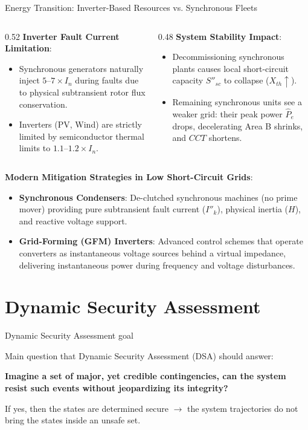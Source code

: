 \begin{frame}[allowframebreaks]{Energy Transition: Inverter-Based Resources vs. Synchronous Fleets}
\begin{columns}
    \begin{column}{0.52\textwidth}
    \textbf{Inverter Fault Current Limitation}:
    \begin{itemize}
        \item Synchronous generators naturally inject $5\text{--}7 \times I_n$ during faults due to physical subtransient rotor flux conservation.
        \item Inverters (PV, Wind) are strictly limited by semiconductor thermal limits to $1.1\text{--}1.2 \times I_n$.
    \end{itemize}
    \end{column}
    \begin{column}{0.48\textwidth}
    \textbf{System Stability Impact}:
    \begin{itemize}
        \item Decommissioning synchronous plants causes local short-circuit capacity $S''_{sc}$ to collapse ($X_{th} \uparrow$).
        \item Remaining synchronous units see a weaker grid: their peak power $\hat{P}_e$ drops, decelerating Area B shrinks, and $CCT$ shortens.
    \end{itemize}
    \end{column}
\end{columns}

\framebreak

\textbf{Modern Mitigation Strategies in Low Short-Circuit Grids}:
\begin{itemize}
    \item \textbf{Synchronous Condensers}: 
    De-clutched synchronous machines (no prime mover) providing pure subtransient fault current ($I''_k$), physical inertia ($H$), and reactive voltage support.
    \item \textbf{Grid-Forming (GFM) Inverters}: 
    Advanced control schemes that operate converters as instantaneous voltage sources behind a virtual impedance, delivering instantaneous power during frequency and voltage disturbances.
\end{itemize}
\end{frame}



\section{{Dynamic Security Assessment}}
\begin{frame}{Dynamic Security Assessment goal}

    Main question that Dynamic Security Assessment (DSA) should answer:

\textbf{Imagine a set of major, yet credible contingencies, can the system resist such events without jeopardizing its integrity?}

If yes, then the states are determined secure $\rightarrow$ the system trajectories do not bring the states inside an unsafe set.
\end{frame}

